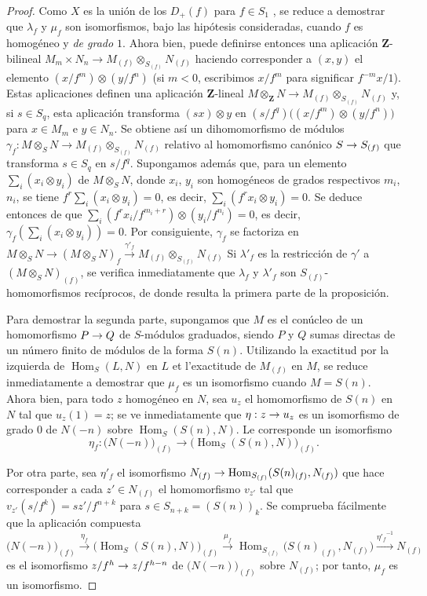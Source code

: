\documentclass[oneside,10pt]{amsart}
\makeatletter
\newcommand{\ega@arrow}[2]{\mathchoice{#1}{#2}{#2}{#2}}
\renewcommand{\to}{\ega@arrow{\longrightarrow}{\rightarrow}}
\newcommand{\oldpage}[2][]{\marginnote{\normalfont\footnotesize\textbf{#1}~|~#2}\ignorespaces}
\makeatother
\begin{document}
\begin{proof}
Como $X$ es la unión de los $D_+(f)$ para $f\in S_1$ , se reduce a demostrar que $\lambda_f$ y $\mu_f$ son isomorfismos, bajo las hipótesis consideradas, cuando $f$ es homogéneo y \emph{de grado $1$}.
Ahora bien, puede definirse entonces una aplicación $\mathbf{Z}$-bilineal $M_m\times N_n\longrightarrow M_{(f)}\otimes_{S_{(f)}}N_{(f)}$ haciendo corresponder a $(x,y)$ el elemento $(x/f^m)\otimes(y/f^n)$ (si $m<0$, escribimos $x/f^m$ para significar $f^{-m}x/1$).
Estas aplicaciones definen una aplicación $\mathbf{Z}$-lineal $M\otimes_{\mathbf{Z}}N\longrightarrow M_{(f)}\otimes_{S_{(f)}}N_{(f)}$ y, si $s\in S_q$, esta aplicación transforma $(sx)\otimes y$ en
$(s/f^q)\bigl((x/f^m)\otimes(y/f^n)\bigr)$
para $x\in M_m$ e $y\in N_n$.
Se obtiene así un dihomomorfismo de módulos
$\gamma_f:M\otimes_S N\longrightarrow M_{(f)}\otimes_{S_{(f)}}N_{(f)}$
relativo al homomorfismo canónico $S\to S_{(f)}$ que transforma $s\in S_q$ en $s/f^q$.
Supongamos además que, para un elemento $\sum_i(x_i\otimes y_i)$ de $M\otimes_S N$, donde $x_i$, $y_i$ son homogéneos de grados respectivos $m_i$, $n_i$, se tiene
$f^r\sum_i(x_i\otimes y_i)=0$,
es decir, $\sum_i(f^rx_i\otimes y_i)=0$.
Se deduce entonces de  que
$\sum_i(f^rx_i/f^{m_i+r})\otimes(y_i/f^{n_i})=0$,
es decir, $\gamma_f(\sum_i(x_i\otimes y_i))=0$.
Por consiguiente, $\gamma_f$ se factoriza en
$M\otimes_S N\longrightarrow(M\otimes_S N)_f\xrightarrow{\gamma'_f}M_{(f)}\otimes_{S_{(f)}}N_{(f)}$
Si $\lambda'_f$ es la restricción de $\gamma'$
\oldpage[II]{35}
a $(M\otimes_S N)_{(f)}$, se verifica inmediatamente que $\lambda_f$ y $\lambda'_f$ son $S_{(f)}$-homomorfismos recíprocos, de donde resulta la primera parte de la proposición.

Para demostrar la segunda parte, supongamos que $M$ es el conúcleo de un homomorfismo $P\to Q$ de $S$-módulos graduados, siendo $P$ y $Q$ sumas directas de un número finito de módulos de la forma $S(n)$.
Utilizando la exactitud por la izquierda de $\operatorname{Hom}_S(L,N)$ en $L$ et l'exactitude
de $M_{(f)}$ en $M$, se reduce inmediatamente a demostrar que $\mu_f$ es un isomorfismo cuando $M=S(n)$.
Ahora bien, para todo $z$ homogéneo en $N$, sea $u_z$ el homomorfismo de $S(n)$ en $N$ tal que $u_z(1)=z$; se ve inmediatamente que $\eta:z\to u_z$ es un isomorfismo de grado $0$ de $N(-n)$ sobre $\operatorname{Hom}_S(S(n),N)$.
Le corresponde un isomorfismo
\[
  \eta_f:\bigl(N(-n)\bigr)_{(f)}
  \longrightarrow
  \bigl(\operatorname{Hom}_S(S(n),N)\bigr)_{(f)}.
\]

Por otra parte, sea $\eta'_f$ el isomorfismo $N_{(f)}\to\operatorname{Hom}_{S_{(f)}}(S(n)_{(f)},N_{(f)})$ que hace corresponder a cada $z'\in N_{(f)}$ el homomorfismo $v_{z'}$ tal que
$v_{z'}(s/f^k)=sz'/f^{n+k}$
para $s\in S_{n+k}=(S(n))_k$.
Se comprueba fácilmente que la aplicación compuesta
\[
  \bigl(N(-n)\bigr)_{(f)}
  \xrightarrow{\eta_f}
  \bigl(\operatorname{Hom}_S(S(n),N)\bigr)_{(f)}
  \xrightarrow{\mu_f}
  \operatorname{Hom}_{S_{(f)}}\bigl(S(n)_{(f)},N_{(f)}\bigr)
  \xrightarrow{{\eta'_f}^{-1}}N_{(f)}
\]
es el isomorfismo $z/f^h\to z/f^{h-n}$ de $\bigl(N(-n)\bigr)_{(f)}$ sobre $N_{(f)}$; por tanto, $\mu_f$ es un isomorfismo.
\end{proof}
\end{document}
